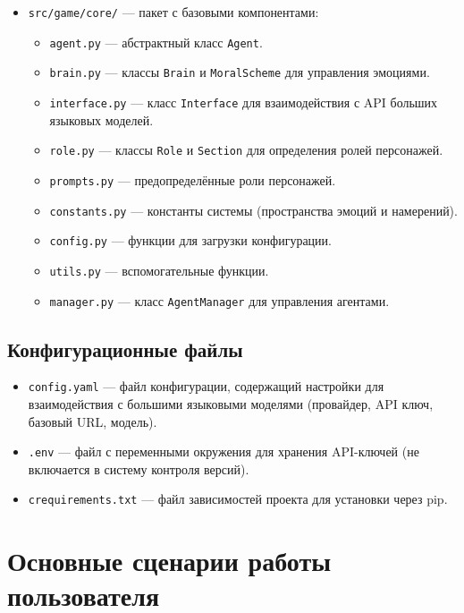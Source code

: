 \begin{itemize}
	\item \texttt{src/game/core/} --- пакет с базовыми компонентами:
	\begin{itemize}
		\item \texttt{agent.py} --- абстрактный класс \texttt{Agent}.
		\item \texttt{brain.py} --- классы \texttt{Brain} и \texttt{MoralScheme} для управления эмоциями.
		\item \texttt{interface.py} --- класс \texttt{Interface} для взаимодействия с API больших языковых моделей.
		\item \texttt{role.py} --- классы \texttt{Role} и \texttt{Section} для определения ролей персонажей.
		\item \texttt{prompts.py} --- предопределённые роли персонажей.
		\item \texttt{constants.py} --- константы системы (пространства эмоций и намерений).
		\item \texttt{config.py} --- функции для загрузки конфигурации.
		\item \texttt{utils.py} --- вспомогательные функции.
		\item \texttt{manager.py} --- класс \texttt{AgentManager} для управления агентами.
	\end{itemize}
\end{itemize}

\subsection{Конфигурационные файлы}

\begin{itemize}
	\item \texttt{config.yaml} --- файл конфигурации, содержащий настройки для взаимодействия с большими языковыми моделями (провайдер, API ключ, базовый URL, модель).
	
	\item \texttt{.env} --- файл с переменными окружения для хранения API-ключей (не включается в систему контроля версий).
	
	\item \texttt{crequirements.txt} --- файл зависимостей проекта для установки через pip.
\end{itemize}




\section{Основные сценарии работы пользователя}

